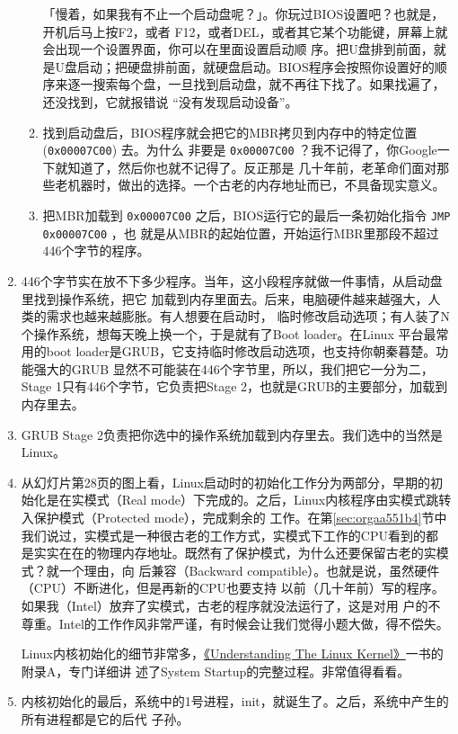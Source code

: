 \documentclass{wx672ctexart}
\begin{document}
\begin{enumerate}
\begin{enumerate}
「慢着，如果我有不止一个启动盘呢？」。你玩过BIOS设置吧？也就是，开机后马上按F2，或者
F12，或者DEL，或者其它某个功能键，屏幕上就会出现一个设置界面，你可以在里面设置启动顺
序。把U盘排到前面，就是U盘启动；把硬盘排前面，就硬盘启动。BIOS程序会按照你设置好的顺
序来逐一搜索每个盘，一旦找到启动盘，就不再往下找了。如果找遍了，还没找到，它就报错说
“没有发现启动设备”。
\item 找到启动盘后，BIOS程序就会把它的MBR拷贝到内存中的特定位置 (\texttt{0x00007C00}) 去。为什么
非要是 \texttt{0x00007C00} ？我不记得了，你Google一下就知道了，然后你也就不记得了。反正那是
几十年前，老革命们面对那些老机器时，做出的选择。一个古老的内存地址而已，不具备现实意义。
\item 把MBR加载到 \texttt{0x00007C00} 之后，BIOS运行它的最后一条初始化指令 \texttt{JMP 0x00007C00} ，也
就是从MBR的起始位置，开始运行MBR里那段不超过446个字节的程序。
\end{enumerate}
\item 446个字节实在放不下多少程序。当年，这小段程序就做一件事情，从启动盘里找到操作系统，把它
加载到内存里面去。后来，电脑硬件越来越强大，人类的需求也越来越膨胀。有人想要在启动时，
临时修改启动选项；有人装了N个操作系统，想每天晚上换一个，于是就有了Boot loader。在Linux
平台最常用的boot loader是GRUB，它支持临时修改启动选项，也支持你朝秦暮楚。功能强大的GRUB
显然不可能装在446个字节里，所以，我们把它一分为二，Stage 1只有446个字节，它负责把Stage
2，也就是GRUB的主要部分，加载到内存里去。
\item GRUB Stage 2负责把你选中的操作系统加载到内存里去。我们选中的当然是Linux。
\item 从幻灯片第28页的图上看，Linux启动时的初始化工作分为两部分，早期的初始化是在实模式（Real
mode）下完成的。之后，Linux内核程序由实模式跳转入保护模式（Protected mode），完成剩余的
工作。在第\ref{sec:orgaa551b4}节中我们说过，实模式是一种很古老的工作方式，实模式下工作的CPU看到的都
是实实在在的物理内存地址。既然有了保护模式，为什么还要保留古老的实模式？就一个理由，向
后兼容（Backward compatible）。也就是说，虽然硬件（CPU）不断进化，但是再新的CPU也要支持
以前（几十年前）写的程序。如果我（Intel）放弃了实模式，古老的程序就没法运行了，这是对用
户的不尊重。Intel的工作作风非常严谨，有时候会让我们觉得小题大做，得不偿失。

Linux内核初始化的细节非常多，\href{https://cs6.swfu.edu.cn/calibre/\#book\_id=11\&library\_id=calibre\&panel=book\_details}{《Understanding The Linux Kernel》}一书的附录A，专门详细讲
述了System Startup的完整过程。非常值得看看。
\item 内核初始化的最后，系统中的1号进程，init，就诞生了。之后，系统中产生的所有进程都是它的后代
子孙。
\end{enumerate}
\end{document}
